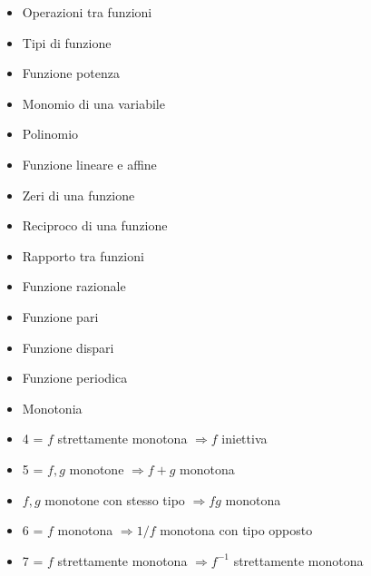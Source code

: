\begin{itemize}
\item Operazioni tra funzioni
\item Tipi di funzione
\item Funzione potenza
\item Monomio di una variabile
\item Polinomio
\item Funzione lineare e affine
\item Zeri di una funzione
\item Reciproco di una funzione
\item Rapporto tra funzioni
\item Funzione razionale
\item Funzione pari
\item Funzione dispari
\item Funzione periodica
\item Monotonia
\item 4 = $f$ strettamente monotona $\Rightarrow f$ iniettiva
\item 5 = $f,g$ monotone $\Rightarrow f+g$ monotona
\item $f,g$ monotone con stesso tipo $\Rightarrow fg$ monotona
\item 6 = $f$ monotona $\Rightarrow 1/f$ monotona con tipo opposto
\item 7 = $f$ strettamente monotona $\Rightarrow f^{-1}$ strettamente monotona
\end{itemize}
